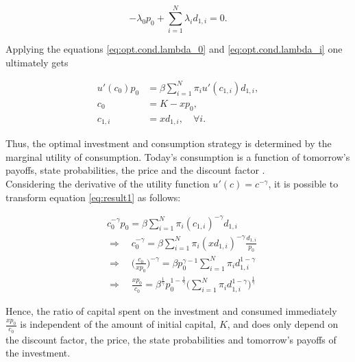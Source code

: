 \begin{equation}
    -\lambda_0 p_0 + \sum_{i=1}^{N} \lambda_i d_{1,i} = 0.
\end{equation}

\bigskip

\noindent Applying the equations \eqref{eq:opt.cond.lambda_0} and \eqref{eq:opt.cond.lambda_i} one ultimately gets

\begin{equation}\label{eq:result1}
\begin{split}
    u'(c_0) p_0 & = \beta \sum_{i=1}^{N} \pi_i u'(c_{1,i}) d_{1,i},\\
    c_0 & = K - x p_0,\\
    c_{1,i} & = x d_{1,i}, \quad \forall i.
\end{split}
\end{equation}

\bigskip

\noindent Thus, the optimal investment and consumption strategy is determined by the marginal utility of consumption. Today's consumption is a function of tomorrow's payoffs, state probabilities, the price and the discount factor \citep{dangl2021notes}. \\

\noindent Considering the derivative of the utility function $u'(c) = c^{-\gamma}$, it is possible to transform equation \eqref{eq:result1} as follows:

\begin{equation}\label{eq:spendings-ratio1}
\begin{split}
    &c_0^{-\gamma}p_0 = \beta \sum_{i=1}^{N} \pi_i (c_{1,i})^{-\gamma} d_{1,i}\\
    &\Rightarrow \quad c_0^{-\gamma} = \beta \sum_{i=1}^{N} \pi_i (xd_{1,i})^{-\gamma} \frac{d_{1,i}}{p_0}\\
    &\Rightarrow \quad \bigg( \frac{c_0}{xp_0} \bigg)^{-\gamma} = \beta p_0^{\gamma-1} \sum_{i=1}^{N} \pi_i d_{1,i}^{1-\gamma}\\
    &\Rightarrow \quad \frac{xp_0}{c_0} = \beta^{\frac{1}{\gamma}} p_0^{1- \frac{1}{\gamma}} \bigg( \sum_{i=1}^{N} \pi_i d_{1,i}^{1-\gamma} \bigg) ^{\frac{1}{\gamma}}
\end{split}
\end{equation}

\bigskip

\noindent Hence, the ratio of capital spent on the investment and consumed immediately $\frac{xp_0}{c_0}$ is independent of the amount of initial capital, $K$, and does only depend on the discount factor, the price, the state probabilities and tomorrow's payoffs of the investment.\\

